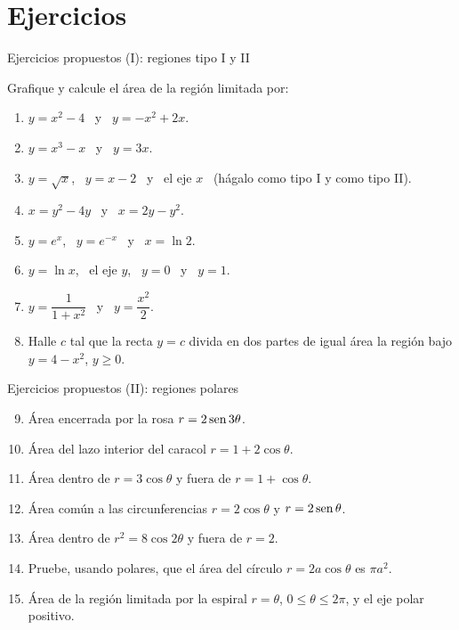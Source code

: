 \documentclass[10pt,aspectratio=169]{beamer}
\begin{document}
\section{Ejercicios}

\begin{frame}{Ejercicios propuestos (I): regiones tipo I y II}
  \begin{ejercicio}
    Grafique y calcule el área de la región limitada por:
    \begin{enumerate}
      \item $y=x^2-4$ \ y \ $y=-x^2+2x$.
      \item $y=x^3-x$ \ y \ $y=3x$.
      \item $y=\sqrt x$, \ $y=x-2$ \ y \ el eje $x$ \ (hágalo como tipo I y como tipo II).
      \item $x=y^2-4y$ \ y \ $x=2y-y^2$.
      \item $y=e^x$, \ $y=e^{-x}$ \ y \ $x=\ln 2$.
      \item $y=\ln x$, \ el eje $y$, \ $y=0$ \ y \ $y=1$.
      \item $y=\dfrac{1}{1+x^2}$ \ y \ $y=\dfrac{x^2}{2}$.
      \item Halle $c$ tal que la recta $y=c$ divida en dos partes de igual área la región bajo $y=4-x^2$, $y\ge0$.
    \end{enumerate}
  \end{ejercicio}
\end{frame}

\begin{frame}{Ejercicios propuestos (II): regiones polares}
  \begin{ejercicio}
    \begin{enumerate}
      \setcounter{enumi}{8}
      \item Área encerrada por la rosa $r=2\operatorname{sen}3\theta$.
      \item Área del lazo interior del caracol $r=1+2\cos\theta$.
      \item Área dentro de $r=3\cos\theta$ y fuera de $r=1+\cos\theta$.
      \item Área común a las circunferencias $r=2\cos\theta$ y $r=2\operatorname{sen}\theta$.
      \item Área dentro de $r^2=8\cos2\theta$ y fuera de $r=2$.
      \item Pruebe, usando polares, que el área del círculo $r=2a\cos\theta$ es $\pi a^2$.
      \item Área de la región limitada por la espiral $r=\theta$, $0\le\theta\le2\pi$, y el eje polar positivo.
    \end{enumerate}
  \end{ejercicio}
\end{frame}
\end{document}
